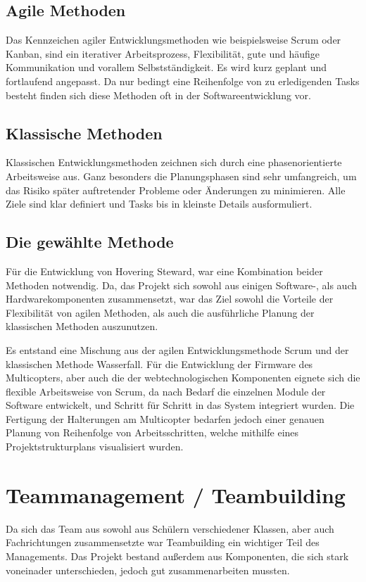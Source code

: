   \subsection{Agile Methoden}
  Das Kennzeichen agiler Entwicklungsmethoden wie beispielsweise Scrum oder Kanban, sind
  ein iterativer Arbeitsprozess, Flexibilität, gute und häufige Kommunikation und vorallem
  Selbstständigkeit. Es wird kurz geplant und fortlaufend angepasst. Da nur bedingt eine Reihenfolge
  von zu erledigenden Tasks besteht finden sich diese Methoden oft in der Softwareentwicklung vor.

  \subsection{Klassische Methoden}
  Klassischen Entwicklungsmethoden zeichnen sich durch eine phasenorientierte Arbeitsweise aus.
  Ganz besonders die Planungsphasen sind sehr umfangreich, um das Risiko später auftretender Probleme oder
  Änderungen zu minimieren. Alle Ziele sind klar definiert und Tasks bis in kleinste Details ausformuliert.

  \subsection{Die gewählte Methode}
  Für die Entwicklung von Hovering Steward, war eine Kombination beider Methoden notwendig. Da,
  das Projekt sich sowohl aus einigen Software-, als auch Hardwarekomponenten zusammensetzt, war das
  Ziel sowohl die Vorteile der Flexibilität von agilen Methoden, als auch die ausführliche Planung der klassischen
  Methoden auszunutzen.

  Es entstand eine Mischung aus der agilen Entwicklungsmethode Scrum und der klassischen Methode Wasserfall.
  Für die Entwicklung der Firmware des Multicopters, aber auch die der webtechnologischen Komponenten eignete
  sich die flexible Arbeitsweise von Scrum, da nach Bedarf die einzelnen Module der Software entwickelt, und Schritt
  für Schritt in das System integriert wurden.
  Die Fertigung der Halterungen am Multicopter bedarfen jedoch einer genauen Planung von Reihenfolge von Arbeitsschritten,
  welche mithilfe eines Projektstrukturplans visualisiert wurden.

\section{Teammanagement / Teambuilding}
Da sich das Team aus sowohl aus Schülern verschiedener Klassen, aber auch Fachrichtungen
zusammensetzte war Teambuilding ein wichtiger Teil des Managements. Das Projekt bestand außerdem
aus Komponenten, die sich stark voneinader unterschieden, jedoch gut zusammenarbeiten mussten.

